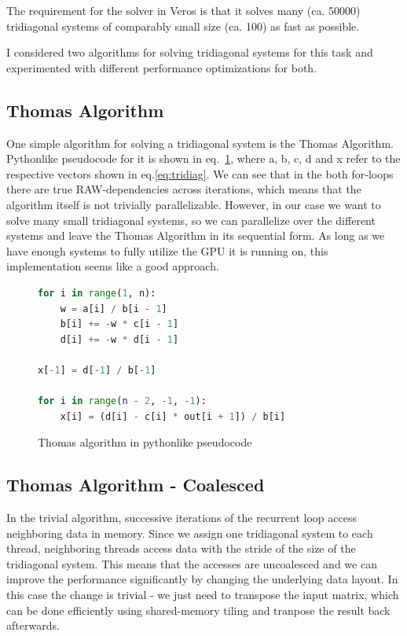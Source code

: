 \documentclass[a4paper,oneside]{memoir}
\begin{document}
The requirement for the solver in Veros is that it solves many (ca. 50000) tridiagonal systems of comparably small size (ca. 100) as fast as possible.

I considered two algorithms for solving tridiagonal systems for this task and experimented with different performance optimizations for both.

\subsection{Thomas Algorithm}
One simple algorithm for solving a tridiagonal system is the Thomas Algorithm.
Pythonlike pseudocode for it is shown in eq.~\ref{fig:thomas}, where a, b, c, d and x refer to the respective vectors shown in eq.\ref{eq:tridiag}.
We can see that in the both for-loops there are true RAW-dependencies across iterations, which means that the algorithm itself is not trivially parallelizable.
However, in our case we want to solve many small tridiagonal systems, so we can parallelize over the different systems and leave the Thomas Algorithm in its sequential form.
As long as we have enough systems to fully utilize the GPU it is running on, this implementation seems like a good approach.

\begin{figure}[hbtp]
    \caption{Thomas algorithm in pythonlike pseudocode}
    \label{fig:thomas}
    \begin{lstlisting}[language=python,frame=single]
for i in range(1, n):
    w = a[i] / b[i - 1]
    b[i] += -w * c[i - 1]
    d[i] += -w * d[i - 1]

x[-1] = d[-1] / b[-1]

for i in range(n - 2, -1, -1):
    x[i] = (d[i] - c[i] * out[i + 1]) / b[i]
    \end{lstlisting}
\end{figure}


\subsection{Thomas Algorithm - Coalesced}
\label{sec:thomas_coal}
In the trivial algorithm, successive iterations of the recurrent loop access neighboring data in memory.
Since we assign one tridiagonal system to each thread, neighboring threads access data with the stride of the size of the tridiagonal system. This means that the accesses are uncoalesced and we can improve the performance significantly by changing the underlying data layout. 
In this case the change is trivial - we just need to transpose the input matrix, which can be done efficiently using shared-memory tiling and tranpose the result back afterwards. 
\end{document}
